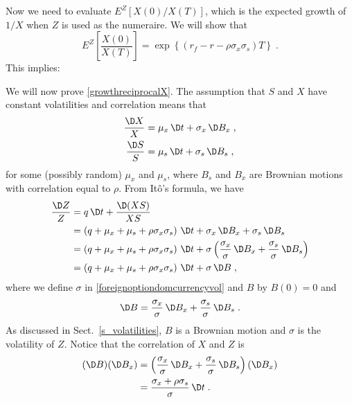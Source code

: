 Now we need to evaluate $E^Z[X(0)/X(T)]$, which is the expected growth of $1/X$ when $Z$ is used as the numeraire.    We will show that
\begin{equation}\label{growthreciprocalX}
E^Z \left[\frac{X(0)}{X(T)}\right] = \exp\left\{(r_f - r-\rho\sigma_x\sigma_s)T\right\}\;.
\end{equation}
This implies:

\begin{petit}
We will now prove \eqref{growthreciprocalX}.  The assumption that $S$ and $X$ have constant volatilities and  correlation means that  
\begin{align*}
\frac{\D X}{X} &= \mu_x\,\D t+\sigma_x\,\D B_x\;,\\
\frac{\D S}{S} &= \mu_s\,\D t+\sigma_s\,\D B_s\;,
\end{align*}
for some (possibly random) $\mu_x$ and $\mu_s$, where $B_s$ and $B_x$ are Brownian motions with correlation equal to $\rho$.  From It\^o's formula, we have
\begin{align*}
\frac{\D Z}{Z} &= q\,\D t + \frac{\D (XS)}{XS}\\
&= \left(q+\mu_x +\mu_s+ \rho\sigma_x\sigma_s\right)\,\D t + \sigma_x\,\D B_x + \sigma_s\,\D B_s \\
&= \left(q+\mu_x +\mu_s+ \rho\sigma_x\sigma_s\right)\,\D t + \sigma\left(\frac{\sigma_x}{\sigma}\,\D B_x + \frac{\sigma_s}{\sigma}\,\D B_s\right) \\
&= \left(q+\mu_x +\mu_s+ \rho\sigma_x\sigma_s\right)\,\D t + \sigma\,\D B\;,
\end{align*}
where we define $\sigma$  in \eqref{foreignoptiondomcurrencyvol} and $B$ by $B(0)=0$ and
$$\D B = \frac{\sigma_x}{\sigma}\,\D B_x + \frac{\sigma_s}{\sigma}\,\D B_s\; .$$
As discussed in Sect.~\ref{s_volatilities}, $B$ is a Brownian motion and $\sigma$ is the volatility of $Z$.
Notice that the correlation of $X$ and $Z$ is
\begin{align*}
(\D B)(\D B_x) &= \left(\frac{\sigma_x}{\sigma}\,\D B_x + \frac{\sigma_s}{\sigma}\,\D B_s\right)(\D B_x)\\
&= \frac{\sigma_x + \rho\sigma_s}{\sigma}\,\D t\;.
\end{align*}

\end{petit}
